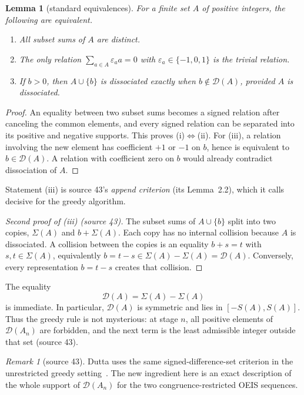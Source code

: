 \documentclass[11pt,a4paper]{article}
\numberwithin{equation}{section}
\newtheorem{lemma}[theorem]{Lemma}
\theoremstyle{definition}
\theoremstyle{remark}
\newtheorem{remark}[theorem]{Remark}
\theoremstyle{plain}
\newcommand{\cD}{\mathcal D}
\newcommand{\src}[1]{\textup{(source #1)}}
\begin{document}
\begin{lemma}[standard equivalences]\label{gdf:lem:diss-equivalence}
For a finite set $A$ of positive integers, the following are equivalent.
\begin{enumerate}[label=(\roman*)]
\item All subset sums of $A$ are distinct.
\item The only relation $\sum_{a\in A}\varepsilon_a a=0$ with
      $\varepsilon_a\in\{-1,0,1\}$ is the trivial relation.
\item If $b>0$, then $A\cup\{b\}$ is dissociated exactly when
      $b\notin\cD(A)$, provided $A$ is dissociated.
\end{enumerate}
\end{lemma}

\begin{proof}
An equality between two subset sums becomes a signed relation after canceling
the common elements, and every signed relation can be separated into its
positive and negative supports.  This proves (i)$\Leftrightarrow$(ii).
For (iii), a relation involving the new element has coefficient $+1$ or $-1$
on $b$, hence is equivalent to $b\in\cD(A)$.  A relation with coefficient zero
on $b$ would already contradict dissociation of $A$.
\end{proof}

Statement (iii) is source 43's \emph{append criterion} (its Lemma~2.2), which
it calls decisive for the greedy algorithm.

\begin{proof}[Second proof of (iii) \src{43}]
The subset sums of $A\cup\{b\}$ split into two copies, $\Sigma(A)$ and
$b+\Sigma(A)$.  Each copy has no internal collision because $A$ is
dissociated.  A collision between the copies is an equality $b+s=t$ with
$s,t\in\Sigma(A)$, equivalently $b=t-s\in\Sigma(A)-\Sigma(A)=\cD(A)$.
Conversely, every representation $b=t-s$ creates that collision.
\end{proof}

The equality
\[
 \cD(A)=\Sigma(A)-\Sigma(A)
\]
is immediate.  In particular, $\cD(A)$ is symmetric and lies in
$[-S(A),S(A)]$.  Thus the greedy rule is not mysterious: at stage $n$, all
positive elements of $\cD(A_n)$ are forbidden, and the next term is the least
admissible integer outside that set \src{43}.

\begin{remark}[source 43]\label{gdf:rem:dutta-criterion}
Dutta uses the same signed-difference-set criterion in the unrestricted
greedy setting~\cite{Dutta2026}.  The new ingredient here is an exact
description of the whole support of $\cD(A_n)$ for the two
congruence-restricted OEIS sequences.
\end{remark}
\end{document}
